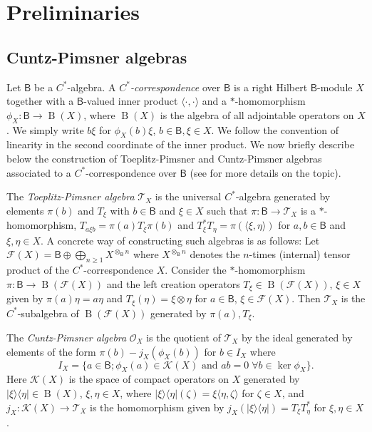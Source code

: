 \documentclass[a4paper,reqno]{amsart}
\numberwithin{equation}{section}
\numberwithin{theorem}{section}
\theoremstyle{definition}\newtheorem{definition}[theorem]{Definition}
\theoremstyle{definition}\newtheorem{remark}[theorem]{Remark}
\theoremstyle{definition}\newtheorem{example}[theorem]{Example}
\theoremstyle{definition}\newtheorem*{notation*}{Notation}
\theoremstyle{definition}\newtheorem*{convention*}{Convention}
\theoremstyle{definition}\newtheorem{observation}{Observation}
\theoremstyle{definition}\newtheorem*{acknowledgment*}{Acknowledgments}
\newcommand{\B}{\mathsf{B}}
\newcommand{\cst}{C^*}
\newcommand{\tx}{\mathcal{T}_X}
\renewcommand{\op}[1]{\operatorname{#1}}
\begin{document}
\section{Preliminaries}
\subsection{Cuntz-Pimsner algebras}

Let $\B$ be a $\cst$-algebra.
A {\em $\cst$-correspondence} over  $\B$ is a right Hilbert $\B$-module $X$ together with a $\B$-valued inner product $\langle\cdot,\cdot\rangle$ and a $\ast$-homomorphism $\phi_X:\B\to\op{B}(X)$, where $\op{B}(X)$ is the algebra of all adjointable operators on $X$. We simply write $b\xi$ for $\phi_X(b)\xi$, $b\in\B,\xi\in X$.  We follow the convention of linearity in the second coordinate of the inner product. We now briefly describe below the construction of Toeplitz-Pimsner and Cuntz-Pimsner algebras  associated to a $C^*$-correspondence over $\B$ (see \cite{Pim} for more details on the topic).

The {\em Toeplitz-Pimsner algebra} $\mathcal{T}_X$ is the universal $\cst$-algebra generated by elements $\pi(b)$ and $T_\xi$ with $b\in\B$ and $\xi\in X$ such that $\pi:\B\to\tx$ is a $\ast$-homomorphism, $T_{a\xi b}=\pi(a)T_\xi\pi(b)$ and $T_{\xi}^*T_\eta=\pi(\langle\xi,\eta\rangle)$ for $a,b\in\B$ and $\xi,\eta\in X$. A concrete way of constructing such algebras is as follows:
Let $\mathcal{F}(X)=\B\oplus\bigoplus_{n\geq 1}X^{\otimes_\B n}$ where $X^{\otimes_\B n}$ denotes the $n$-times (internal) tensor product of the $\cst$-correspondence $X$. Consider the $\ast$-homomorphism $\pi:\B\to\op{B}({\mathcal{F}(X)})$ and the left creation operators $T_\xi\in \op{B}({\mathcal{F}(X)})$, $\xi\in X$  given by $\pi(a)\eta=a\eta$ and $T_\xi(\eta)=\xi\otimes\eta$ for $a\in\B$, $\xi\in \mathcal{F}(X)$. Then $\tx$ is the $\cst$-subalgebra of $\op{B}(\mathcal{F}(X))$ generated by $\pi(a), T_\xi$.


The {\em Cuntz-Pimsner algebra} $\mathcal{O}_X$ is the quotient of $\tx$ by the ideal generated by elements of the form $\pi(b)-j_X(\phi_X(b))$ for $b\in I_X$ where \[I_X=\{a\in \B; \phi_X(a)\in \mathcal{K}(X) \mbox{ and } ab=0\;\forall b\in \ker\phi_X\}.\] Here $\mathcal{K}(X)$ is the space of compact operators on $X$ generated by $|\xi\rangle\langle\eta|\in \op{B}(X)$, $\xi,\eta\in X$, where $|\xi\rangle\langle\eta|(\zeta)=\xi\langle\eta,\zeta\rangle$ for $\zeta\in X$, and $j_X:\mathcal{K}(X)\to\tx$ is the homomorphism given by $j_X(|\xi\rangle\langle\eta|)=T_\xi T_\eta^*$ for $\xi,\eta\in X$.
\end{document}

